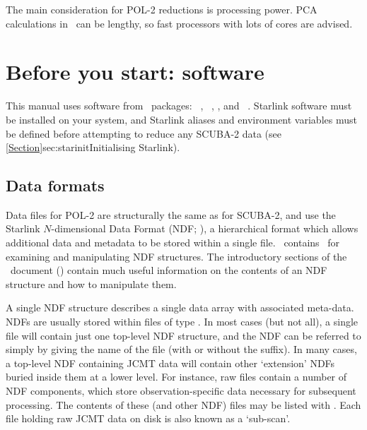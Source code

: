 The main consideration for POL-2 reductions is processing power. PCA calculations in
\makemap\ can be lengthy, so fast processors with lots of cores are advised.


\section{Before you start: software}

This manual uses software from \starlink\ packages: \smurf\
\cite{smurf}, \Kappa\ \cite{kappa}, \polpack \cite{polpack}, and \gaia\ \cite{gaia}.
Starlink software must be installed on your system, and Starlink
aliases and environment variables must be defined before attempting
to reduce any SCUBA-2 data (see
\cref{Section}{sec:starinit}{Initialising Starlink}).


\subsection{Data formats}
\label{sec:ndf}

Data files for POL-2 are structurally the same as for SCUBA-2, and use
the Starlink $N$-dimensional Data Format (NDF;
\cite{ndf}), a hierarchical format which allows
additional data and metadata to be stored within a single file. \Kappa\
contains \ for examining and
manipulating NDF structures. The introductory sections of the \Kappa\
document () contain much useful information on
the contents of an NDF structure and how to manipulate them.

A single NDF structure describes a single data array with associated
meta-data. NDFs are usually stored within files of type .
In most cases (but not all), a single  file will contain just
one top-level NDF structure, and the NDF can be referred to simply by
giving the name of the file (with or without the \file{.sdf} suffix).
In many cases, a top-level NDF containing JCMT data will contain other
`extension' NDFs buried inside them at a lower level. For instance, raw
files contain a number of NDF components, which store observation-specific
data necessary for subsequent processing. The contents of these (and
other NDF) files may be listed with \HDSTRACEref. Each file holding raw
JCMT data on disk is also known as a `sub-scan'.

